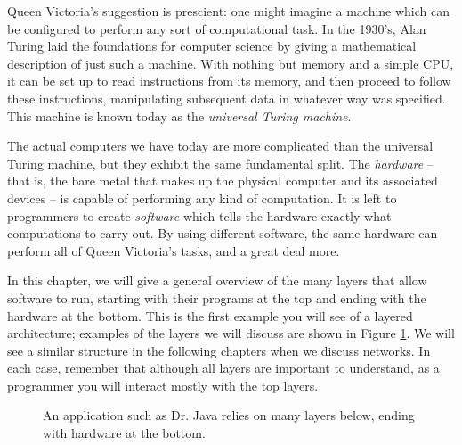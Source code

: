 Queen Victoria's suggestion is prescient: one might imagine a machine which can be configured to perform any sort of computational task. In the 1930's, Alan Turing laid the foundations for computer science by giving a mathematical description of just such a machine. With nothing but memory and a simple CPU, it can be set up to read instructions from its memory, and then proceed to follow these instructions, manipulating subsequent data in whatever way was specified. This machine is known today as the \emph{universal Turing machine}.

The actual computers we have today are more complicated than the universal Turing machine, but they exhibit the same fundamental split. The \emph{hardware} -- that is, the bare metal that makes up the physical computer and its associated devices -- is capable of performing any kind of computation. It is left to programmers to create \emph{software} which tells the hardware exactly what computations to carry out. By using different software, the same hardware can perform all of Queen Victoria's tasks, and a great deal more.

In this chapter, we will give a general overview of the many layers that allow software to run, starting with their programs at the top and ending with the hardware at the bottom. This is the first example you will see of a layered architecture; examples of the layers we will discuss are shown in Figure \ref{fig:hw_sw:layers}. We will see a similar structure in the following chapters when we discuss networks. In each case, remember that although all layers are important to understand, as a programmer you will interact mostly with the top layers.

\begin{figure}
    \centering
    \caption{An application such as Dr. Java relies on many layers below, ending with hardware at the bottom.}
    \label{fig:hw_sw:layers}
\end{figure}

